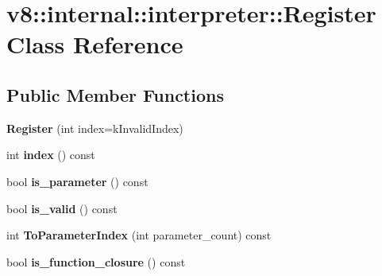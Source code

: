 \hypertarget{classv8_1_1internal_1_1interpreter_1_1_register}{}\section{v8\+:\+:internal\+:\+:interpreter\+:\+:Register Class Reference}
\label{classv8_1_1internal_1_1interpreter_1_1_register}
\subsection*{Public Member Functions}
\begin{DoxyCompactItemize}
\item 
{\bfseries Register} (int index=k\+Invalid\+Index)\hypertarget{classv8_1_1internal_1_1interpreter_1_1_register_ae22123d22e3c2463c7f344f53dab0664}{}\label{classv8_1_1internal_1_1interpreter_1_1_register_ae22123d22e3c2463c7f344f53dab0664}

\item 
int {\bfseries index} () const \hypertarget{classv8_1_1internal_1_1interpreter_1_1_register_a29de89da581e9acd6e44ff952ffc1dc0}{}\label{classv8_1_1internal_1_1interpreter_1_1_register_a29de89da581e9acd6e44ff952ffc1dc0}

\item 
bool {\bfseries is\+\_\+parameter} () const \hypertarget{classv8_1_1internal_1_1interpreter_1_1_register_a56ba9c456330a17d1b62585ddb3c919b}{}\label{classv8_1_1internal_1_1interpreter_1_1_register_a56ba9c456330a17d1b62585ddb3c919b}

\item 
bool {\bfseries is\+\_\+valid} () const \hypertarget{classv8_1_1internal_1_1interpreter_1_1_register_ab4ef14e7e12ba55156925f3fd5ebf519}{}\label{classv8_1_1internal_1_1interpreter_1_1_register_ab4ef14e7e12ba55156925f3fd5ebf519}

\item 
int {\bfseries To\+Parameter\+Index} (int parameter\+\_\+count) const \hypertarget{classv8_1_1internal_1_1interpreter_1_1_register_a572e61916e6a86a8f7048e7f49afac2d}{}\label{classv8_1_1internal_1_1interpreter_1_1_register_a572e61916e6a86a8f7048e7f49afac2d}

\item 
bool {\bfseries is\+\_\+function\+\_\+closure} () const \hypertarget{classv8_1_1internal_1_1interpreter_1_1_register_aa2f17c24d2afd241b4ca3ca629376cb0}{}\label{classv8_1_1internal_1_1interpreter_1_1_register_aa2f17c24d2afd241b4ca3ca629376cb0}


\end{DoxyCompactItemize}
